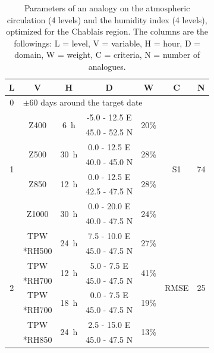 \documentclass[twocol]{ametsoc}
\begin{document}
\begin{table}[htbp]
	\footnotesize
	\caption{Parameters of an analogy on the atmospheric circulation (4 levels) and the humidity index (4 levels), optimized for the Chablais region. The columns are the followings: L = level, V = variable, H = hour, D = domain, W = weight, C = criteria, N = number of analogues.}
	\begin{center}
		\begin{tabular}{ccccccc}
			\hline \textbf{L} & \textbf{V} & \textbf{H} & \textbf{D} & \textbf{W} & \textbf{C} & \textbf{N} \\ 
			\hline 
			0 & \multicolumn{6}{l}{$\pm 60$ days around the target date} \\
			\hline 
			\multirow{8}{*}{1} &  \multirow{2}{*}{Z400} & \multirow{2}{*}{6~h} & -5.0 - 12.5 \degree E & \multirow{2}{*}{20\%} & \multirow{8}{*}{S1} & \multirow{8}{*}{74} \\
			& & & 45.0 - 52.5 \degree N & & & \\ 
			& \multirow{2}{*}{Z500} & \multirow{2}{*}{30~h} & 0.0 - 12.5 \degree E & \multirow{2}{*}{28\%} & & \\ 
			& & & 40.0 - 45.0 \degree N & & & \\ 
			& \multirow{2}{*}{Z850} & \multirow{2}{*}{12~h} & 0.0 - 12.5 \degree E & \multirow{2}{*}{28\%} & & \\ 
			& & & 42.5 - 47.5 \degree N & & & \\ 
			& \multirow{2}{*}{Z1000} & \multirow{2}{*}{30~h} & 0.0 - 20.0 \degree E & \multirow{2}{*}{24\%} & & \\ 
			& & & 40.0 - 47.5 \degree N & & & \\ 
			\hline 
			\multirow{8}{*}{2} & TPW & \multirow{2}{*}{24~h} & 7.5 - 10.0 \degree E & \multirow{2}{*}{27\%} & \multirow{8}{*}{RMSE} & \multirow{8}{*}{25} \\
			& *RH500 & & 45.0 - 47.5 \degree N & & & \\ 
			& TPW & \multirow{2}{*}{12~h} & 5.0 - 7.5 \degree E & \multirow{2}{*}{41\%} & & \\ 
			& *RH700 & & 45.0 - 47.5 \degree N & & & \\ 
			& TPW & \multirow{2}{*}{18~h} & 0.0 - 7.5 \degree E & \multirow{2}{*}{19\%} & & \\ 
			& *RH700 & & 45.0 - 47.5 \degree N & & & \\ 
			& TPW & \multirow{2}{*}{24~h} & 2.5 - 15.0 \degree E & \multirow{2}{*}{13\%} & & \\ 
			& *RH850 & & 45.0 - 47.5 \degree N & & & \\ 
			\hline 
		\end{tabular} 
	\end{center}
	\label{table:params_GA_z4_hi4}
\end{table}
\end{document}
